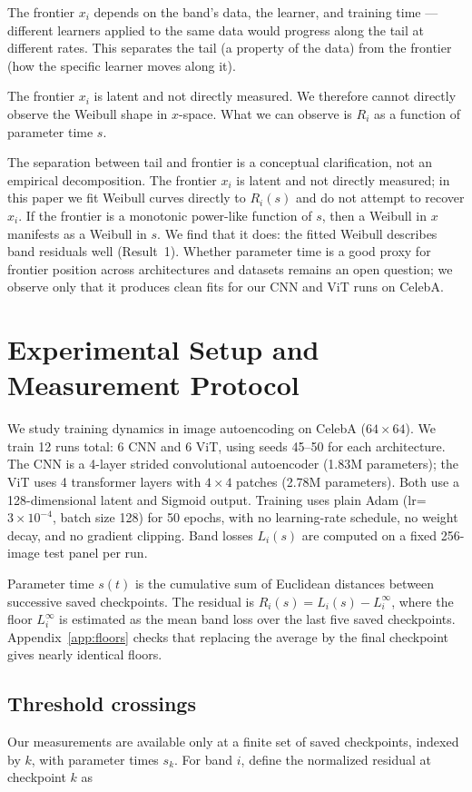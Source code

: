 \documentclass{article}
\begin{document}
The frontier $x_i$ depends on the band's data, the learner, and training
time --- different learners applied to the same data would progress
along the tail at different rates. This separates the tail (a property
of the data) from the frontier (how the specific learner moves along
it).

The frontier $x_i$ is latent and not directly measured. We therefore
cannot directly observe the Weibull shape in $x$-space. What we can
observe is $R_i$ as a function of parameter time $s$.

The separation between tail and frontier is a conceptual clarification,
not an empirical decomposition. The frontier $x_i$ is latent and not
directly measured; in this paper we fit Weibull curves directly to $R_i(s)$
and do not attempt to recover $x_i$. If the frontier is a monotonic power-like
function of $s$, then a Weibull in $x$ manifests as a Weibull in $s$. 
We find that it does: the fitted Weibull describes
band residuals well (Result~1). Whether
parameter time is a good proxy for frontier position across
architectures and datasets remains an open question; we observe only
that it produces clean fits for our CNN and ViT runs on CelebA.

\section{Experimental Setup and Measurement Protocol}
\label{experimental-setup}

We study training dynamics in image autoencoding on CelebA ($64\times 64$). We
train 12 runs total: 6 CNN and 6 ViT, using seeds 45--50 for each
architecture. The CNN is a 4-layer strided convolutional autoencoder
(1.83M parameters); the ViT uses 4 transformer layers with $4\times 4$ patches
(2.78M parameters). Both use a 128-dimensional latent and Sigmoid
output. Training uses plain Adam (lr=$3\times10^{-4}$, batch size 128) for 50
epochs, with no learning-rate schedule, no weight decay, and no gradient
clipping. Band losses $L_i(s)$ are computed on a fixed 256-image
test panel per run.

Parameter time $s(t)$ is the cumulative sum of Euclidean distances
between successive saved checkpoints. The residual is
$R_i(s)=L_i(s)-L_i^\infty$, where the floor $L_i^\infty$ is estimated as
the mean band loss over the last five saved checkpoints.
Appendix~\ref{app:floors} checks that replacing the average by the final
checkpoint gives nearly identical floors.

\subsection{Threshold crossings}\label{threshold-crossings}
Our measurements are available only at a finite set of saved checkpoints,
indexed by $k$, with parameter times $s_k$. For band $i$, define
the normalized residual at checkpoint $k$ as
\end{document}

